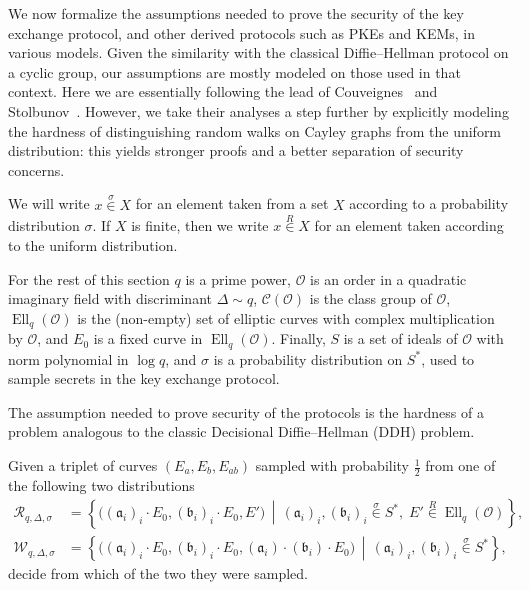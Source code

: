 \documentclass{llncs}
\newcommand{\Cl}{\mathcal{C}}
\renewcommand{\O}{\mathcal{O}}
\newcommand{\suchthat}{\,\middle\vert\,}
\renewcommand{\frak}{\mathfrak}
\newcommand{\rand}[1]{\overset{#1}{∈}}
\newcommand{\uni}{\rand{R}}
\DeclareMathOperator{\Ell}{Ell}
\begin{document}
We now formalize the assumptions needed to prove the security of the
key exchange protocol, and other derived protocols such as PKEs and
KEMs, in various models. Given the similarity with the classical
Diffie--Hellman protocol on a cyclic group, our assumptions are
mostly modeled on those used in that context. Here we are
essentially following the lead of
Couveignes~\cite{cryptoeprint:2006:291} and
Stolbunov~\cite{Stol,Stolbunov2012}.
However, we take their analyses a
step further by explicitly modeling the hardness of distinguishing
random walks on Cayley graphs from the uniform distribution: this
yields stronger proofs and a better separation of security concerns.

We will write $x\rand{σ} X$ for an element taken from a set $X$
according to a probability distribution $σ$. If $X$ is finite,
then we write $x\uni X$ for an element taken according to the uniform
distribution.

For the rest of this section $q$ is a prime power, $\O$ is an order in
a quadratic imaginary field with discriminant $Δ\sim q$, $\Cl(\O)$ is
the class group of $\O$, $\Ell_q(\O)$ is the (non-empty) set of
elliptic curves with complex multiplication by $\O$, and $E_0$ is a
fixed curve in $\Ell_q(\O)$. Finally, $S$ is a set of ideals of $\O$
with norm polynomial in $\log q$, and $σ$ is a probability
distribution on $S^*$, used to sample secrets in the key exchange
protocol.

The assumption needed to prove security of the protocols is 
the hardness of a problem analogous to 
the classic Decisional Diffie--Hellman (DDH) problem.

\begin{definition}
    Given a triplet of curves $(E_a,E_b,E_{ab})$
    sampled with probability $\frac{1}{2}$ 
    from one of the following two distributions
  \begin{align*}
    \mathcal{R}_{q,Δ,σ} &= \left\{\bigl((\frak a_i)_i·E_0,(\frak b_i)_i·E_0,E'\bigr) \suchthat
                        (\frak a_i)_i,(\frak b_i)_i\rand{σ}S^*,\;
                        E'\uni\Ell_q(\O)\right\},\\
    \mathcal{W}_{q,Δ,σ} &= \left\{\bigl((\frak a_i)_i·E_0,(\frak b_i)_i·E_0,(\frak a_i)·(\frak b_i)·E_0\bigr) \suchthat
                          (\frak a_i)_i,(\frak b_i)_i\rand{σ}S^*\right\},
  \end{align*}
  decide from which of the two they were sampled.
\end{definition}
\end{document}
